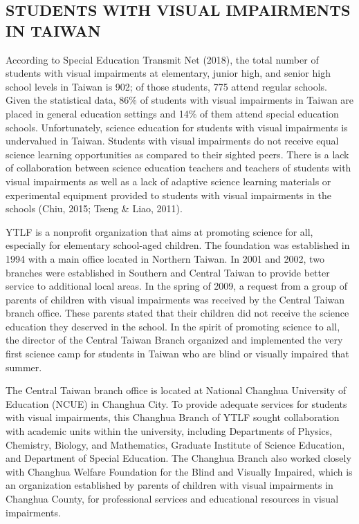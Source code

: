 \documentclass[11.5pt]{sig-alternate} %
\begin{document}
\begin{large}
\section*{STUDENTS WITH VISUAL IMPAIRMENTS IN TAIWAN}

According to Special Education Transmit Net (2018), the total number of students with visual impairments at elementary, junior high, and senior high school levels in Taiwan is 902; of those students, 775 attend regular schools. Given the statistical data, 86\% of students with visual impairments in Taiwan are placed in general education settings and 14\% of them attend special education schools. Unfortunately, science education for students with visual impairments is undervalued in Taiwan. Students with visual impairments do not receive equal science learning opportunities as compared to their sighted peers. There is a lack of collaboration between science education teachers and teachers of students with visual impairments as well as a lack of adaptive science learning materials or experimental equipment provided to students with visual impairments in the schools (Chiu, 2015; Tseng \& Liao, 2011).

YTLF is a nonprofit organization that aims at promoting science for all, especially for elementary school-aged children. The foundation was established in 1994 with a main office located in Northern Taiwan. In 2001 and 2002, two branches were established in Southern and Central Taiwan to provide better service to additional local areas. In the spring of 2009, a request from a group of parents of children with visual impairments was received by the Central Taiwan branch office. These parents stated that their children did not receive the science education they deserved in the school. In the spirit of promoting science to all, the director of the Central Taiwan Branch organized and implemented the very first science camp for students in Taiwan who are blind or visually impaired that summer.

The Central Taiwan branch office is located at National Changhua University of Education (NCUE) in Changhua City. To provide adequate services for students with visual impairments, this Changhua Branch of YTLF sought collaboration with academic units within the university, including Departments of Physics, Chemistry, Biology, and Mathematics, Graduate Institute of Science Education, and Department of Special Education. The Changhua Branch also worked closely with Changhua Welfare Foundation for the Blind and Visually Impaired, which is an organization established by parents of children with visual impairments in Changhua County, for professional services and educational resources in visual impairments.


\end{large}
\end{document}
